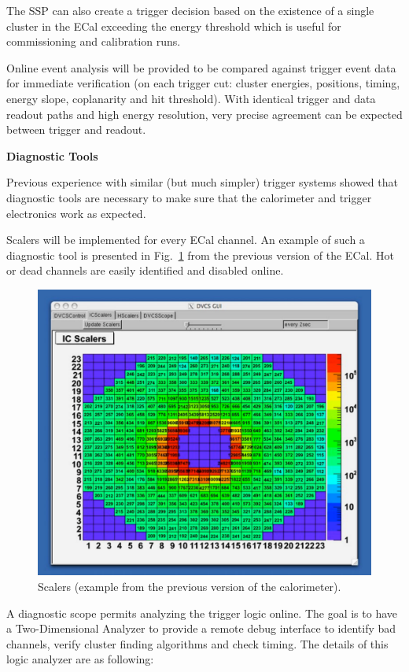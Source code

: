 The SSP can also create a trigger decision based on the existence of a single cluster in the ECal exceeding the energy threshold which is  useful for commissioning and calibration runs. 

Online event analysis will be provided to be compared against trigger event data for immediate verification (on each trigger cut: cluster energies, positions, timing, energy slope, coplanarity and hit threshold). With identical trigger and data readout paths and high energy resolution, very precise agreement can be expected between trigger and readout.



\vspace{1cm}
{\bf Diagnostic Tools}

Previous experience with similar (but much simpler) trigger systems showed that diagnostic tools are necessary to make sure that the calorimeter and trigger electronics work as expected. 

Scalers will be implemented for every ECal channel. An example of such a diagnostic tool is presented in Fig.~\ref{fig:dvcs_beam}
from the previous version of the ECal. Hot or dead channels are easily identified and disabled online.
\begin{figure}[h]
\includegraphics[scale=0.52]{daq_trigger/figures/dvcs_beam}
\caption{\small{Scalers (example from the previous version of the calorimeter).}}
\label{fig:dvcs_beam}
\end{figure}
A diagnostic scope permits analyzing the trigger logic online. The goal is to have a Two-Dimensional Analyzer
 to provide a remote debug interface to identify bad channels, verify cluster finding algorithms and check timing.
 The details of this logic analyzer are as following:
 

